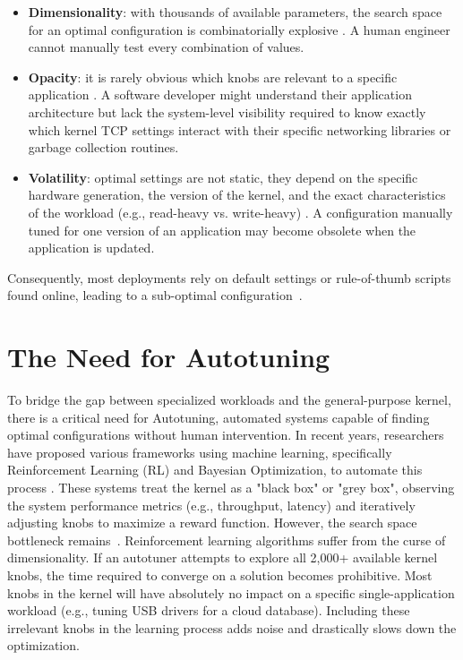 \begin{itemize}
    \item \textbf{Dimensionality}: with thousands of available parameters, the search space for an optimal configuration is combinatorially explosive \cite{stun2022}. A human engineer cannot manually test every combination of values.
    \item \textbf{Opacity}: it is rarely obvious which knobs are relevant to a specific application \cite{kml2021}. A software developer might understand their application architecture but lack the system-level visibility required to know exactly which kernel TCP settings interact with their specific networking libraries or garbage collection routines.
    \item \textbf{Volatility}: optimal settings are not static, they depend on the specific hardware generation, the version of the kernel, and the exact characteristics of the workload (e.g., read-heavy vs. write-heavy) \cite{kml2021}. A configuration manually tuned for one version of an application may become obsolete when the application is updated.
\end{itemize}

Consequently, most deployments rely on default settings or rule-of-thumb scripts found online, leading to a sub-optimal configuration~\cite{kml2021,stun2022}.

\section{The Need for Autotuning}

To bridge the gap between specialized workloads and the general-purpose kernel, there is a critical need for Autotuning, automated systems capable of finding optimal configurations without human intervention.
In recent years, researchers have proposed various frameworks using machine learning, specifically Reinforcement Learning (RL) and Bayesian Optimization, to automate this process \cite{cherrypick2017,stun2022,bestconfig2017}.
These systems treat the kernel as a "black box" or "grey box", observing the system performance metrics (e.g., throughput, latency) and iteratively adjusting knobs to maximize a reward function.
However, the search space bottleneck remains~\cite{cherrypick2017,bestconfig2017}.
Reinforcement learning algorithms suffer from the curse of dimensionality.
If an autotuner attempts to explore all 2,000+ available kernel knobs, the time required to converge on a solution becomes prohibitive.
Most knobs in the kernel will have absolutely no impact on a specific single-application workload (e.g., tuning USB drivers for a cloud database).
Including these irrelevant knobs in the learning process adds noise and drastically slows down the optimization.


